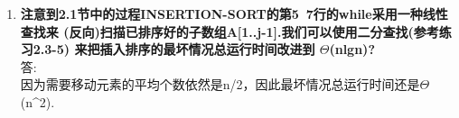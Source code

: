 \begin{enumerate}
\item
\textbf{注意到2.1节中的过程INSERTION-SORT的第5~7行的while采用一种线性查找来
        (反向)扫描已排序好的子数组A[1..j-1].我们可以使用二分查找(参考练习2.3-5)
        来把插入排序的最坏情况总运行时间改进到 $\Theta$(nlgn)?}\\
答:\\
因为需要移动元素的平均个数依然是n/2，因此最坏情况总运行时间还是$\Theta$(n^2).

\end{enumerate}

